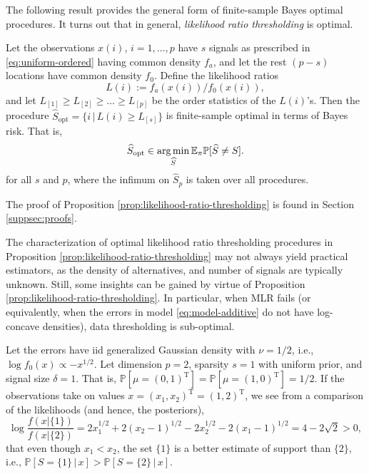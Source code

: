 The following result provides the general form of finite-sample Bayes optimal procedures.
It turns out that in general, \emph{likelihood ratio thresholding} is optimal.

\begin{proposition} \label{prop:likelihood-ratio-thresholding}
Let the observations $x(i)$, $i=1,\ldots,p$ have $s$ signals as prescribed in \eqref{eq:uniform-ordered} having common density $f_a$, and let the rest $(p-s)$ locations have common density $f_0$.
Define the likelihood ratios 
$$
L(i) := {f_a(x(i))}\big/{f_0(x(i))},
$$
and let $L_{[1]} \ge L_{[2]} \ge \ldots \ge L_{[p]}$ be the order statistics of the $L(i)$'s.
Then the procedure $\widehat{S}_{\text{opt}} = \{i\,|\,L(i) \ge L_{[s]}\}$ is finite-sample optimal in terms of Bayes risk. That is,
\begin{equation}
    \widehat{S}_{\text{opt}} \in \operatorname*{arg\,min}_{\widehat{S}} {\mathbb E}_\pi {\mathbb P}[\widehat{S} \neq S].
\end{equation}
for all $s$ and $p$, where the infimum on $\widehat{S}_p$ is taken over all procedures.
\end{proposition} 

The proof of Proposition \ref{prop:likelihood-ratio-thresholding} is found  in Section \ref{suppsec:proofs}.


The characterization of optimal likelihood ratio thresholding procedures in Proposition \ref{prop:likelihood-ratio-thresholding} may not always yield practical estimators, as the density of alternatives, and number of signals are typically unknown.
Still, some insights can be gained by virtue of Proposition \ref{prop:likelihood-ratio-thresholding}.
In particular, when MLR fails (or equivalently, when the errors in model \eqref{eq:model-additive} do not have log-concave densities), data thresholding is sub-optimal. 


\begin{example} \label{exmp:suboptimal-data-thresholding}
Let the errors have iid generalized Gaussian density with $\nu=1/2$, i.e., $\log{f_0(x)}\propto -x^{1/2}$. 
Let dimension $p=2$, sparsity $s=1$ with uniform prior, and signal size $\delta=1$.
That is, $\mathbb P[\mu = (0,1)^\mathrm{T}] = \mathbb P[\mu = (1,0)^\mathrm{T}] = 1/2$.
If the observations take on values $x = (x_1, x_2)^\mathrm{T} = (1,2)^\mathrm{T}$, we see from a comparison of the likelihoods (and hence, the posteriors),
$$
\log \frac{f(x|\{1\})}{f(x|\{2\})} = 2x_1^{1/2} + 2(x_2 - 1)^{1/2} - 2x_2^{1/2} - 2(x_1 - 1)^{1/2} = 4 - 2\sqrt{2} > 0,
$$
that even though $x_1<x_2$, the set $\{1\}$ is a better estimate of support than $\{2\}$, i.e., $\mathbb P[S=\{1\}\,\big|\,x] > \mathbb P[S=\{2\}\,\big|\,x]$.
\end{example}

